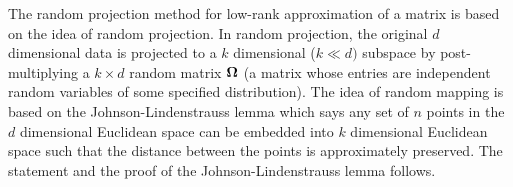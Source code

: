 \documentclass[12pt]{article}
\begin{document}



The random projection method for low-rank approximation of a matrix is based on the idea of random projection. 
In random projection, the original $d$ dimensional data is projected to a $k$ dimensional ($k \ll d)$ subspace by post-multiplying a $k \times d$ random matrix $\bm{\Omega}$ (a matrix whose entries are independent random variables of some specified distribution). The idea of random mapping is based on the Johnson-Lindenstrauss lemma which says any set of $n$ points in the $d$ dimensional Euclidean space can be embedded into $k$ dimensional Euclidean space such that the distance between the points is approximately preserved. %
The statement and the proof of the Johnson-Lindenstrauss lemma follows.
\end{document}
